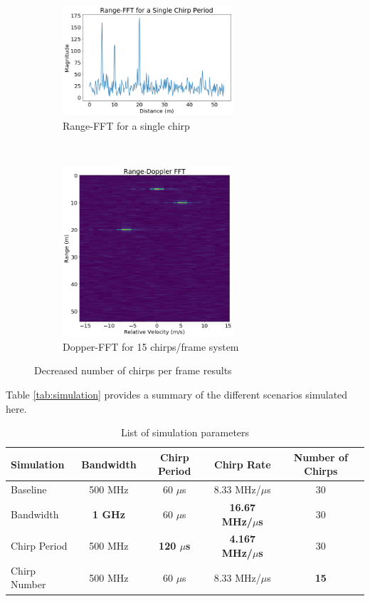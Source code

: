 \begin{figure}[h]
	\centering 
	\begin{subfigure}[c]{0.5\textwidth}
		\centering
		\includegraphics[width=2.5in]{imgs/chirps_range}
		\caption{Range-FFT for a single chirp}
	\end{subfigure}%
	~
	\begin{subfigure}[c]{0.5\textwidth}
		\centering
		\includegraphics[width=2.5in]{imgs/chirps_doppler}
		\caption{Dopper-FFT for 15 chirps/frame system}
	\end{subfigure}
	\caption{Decreased number of chirps per frame results}
	\label{fig:chirps}
\end{figure}

Table \ref{tab:simulation} provides a summary of the different scenarios
simulated here.

\begin{table}[h] 
	\centering
	\begin{tabular}{l|c|c|c|c}
		Simulation & Bandwidth & Chirp Period & Chirp Rate & Number of
		Chirps \\
		\hline
		Baseline&500 MHz&60 $\mu$s&8.33 MHz/$\mu$s&30\\
		Bandwidth&\bf{1 GHz}&60 $\mu$s&\bf{16.67 MHz/$\mu$s}&30\\
		Chirp Period&500 MHz&\bf{120 $\mu$s}&\bf{4.167 MHz/$\mu$s}&30\\
		Chirp Number&500 MHz&60 $\mu$s&8.33 MHz/$\mu$s&\bf{15}\\
	\end{tabular}
	\caption{List of simulation parameters}
	\label{tab:simulations}
\end{table}	
